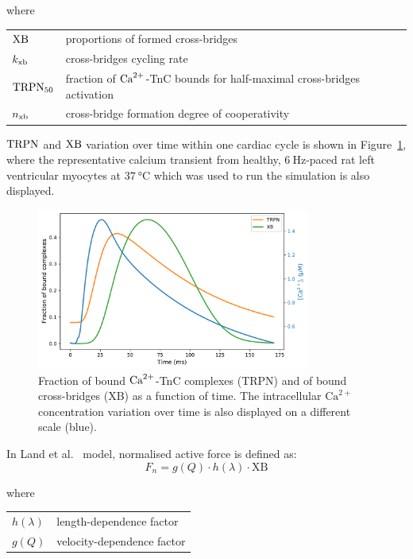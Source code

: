 \noindent
where

\vspace{0.2cm}
\begin{tabular}{ll}
    $\textrm{XB}$    & proportions of formed cross-bridges \\
    $k_{\textrm{xb}}$   & cross-bridges cycling rate \\
    $\textrm{TRPN}_{50}$ & fraction of $\textrm{Ca}^{2+}$-TnC bounds for half-maximal cross-bridges activation \\
    $n_{\textrm{xb}}$   & cross-bridge formation degree of cooperativity
\end{tabular}

\vspace{0.3cm}\noindent
$\textrm{TRPN}$ and $\textrm{XB}$ variation over time within one cardiac cycle is shown in Figure~\ref{fig:catrpnxb}, where the representative calcium
transient from healthy, $\SI{6}{\hertz}$-paced rat left ventricular myocytes at $\SI{37}{\celsius}$ which was used to run the simulation is also displayed.

\begin{figure}[!ht]
    \myfloatalign
    \includegraphics[width=0.8\textwidth]{figures/chapter02/Ca_TRPN_XB.pdf}
    \caption{Fraction of bound $\textrm{Ca}^{2+}$-TnC complexes (TRPN) and of bound cross-bridges (XB) as a function of time. The intracellular $\textrm{Ca}^{2+}$ concentration variation over time is also displayed on a different scale (blue).}
    \label{fig:catrpnxb}
\end{figure}

\vspace{0.3cm}
In Land et al.~\cite{Land:2012} model, normalised active force is defined as:
%
\begin{equation}\label{eq:normforce}
    F_n = g(Q)\cdot h(\lambda)\cdot \text{XB}
\end{equation}

\noindent
where

\vspace{0.2cm}
\begin{tabular}{ll}
    $h(\lambda)$ & length-dependence factor \\
    $g(Q)$       & velocity-dependence factor
\end{tabular}

